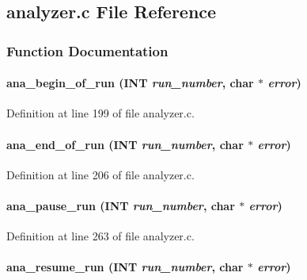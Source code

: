 \subsection{analyzer.c File Reference}
\label{analyzer_8c}


\subsubsection{Function Documentation}
\paragraph[{ana\_\-begin\_\-of\_\-run}]{ ana\_\-begin\_\-of\_\-run ({\bf INT} {\em run\_\-number}, \/  char $\ast$ {\em error})}\hfill\label{analyzer_8c_a22c6bd312e4f7ffd79162e64835cfd42}


Definition at line 199 of file analyzer.c.
\paragraph[{ana\_\-end\_\-of\_\-run}]{ ana\_\-end\_\-of\_\-run ({\bf INT} {\em run\_\-number}, \/  char $\ast$ {\em error})}\hfill\label{analyzer_8c_a8e03cbe2637bd6f4488a659c9f23d29e}


Definition at line 206 of file analyzer.c.
\paragraph[{ana\_\-pause\_\-run}]{ ana\_\-pause\_\-run ({\bf INT} {\em run\_\-number}, \/  char $\ast$ {\em error})}\hfill\label{analyzer_8c_a86f2bc78d542107ce023a1d54f79b13e}


Definition at line 263 of file analyzer.c.
\paragraph[{ana\_\-resume\_\-run}]{ ana\_\-resume\_\-run ({\bf INT} {\em run\_\-number}, \/  char $\ast$ {\em error})}\hfill\label{analyzer_8c_a35f57e1efbd308b1ca049035dcdc13f6}


